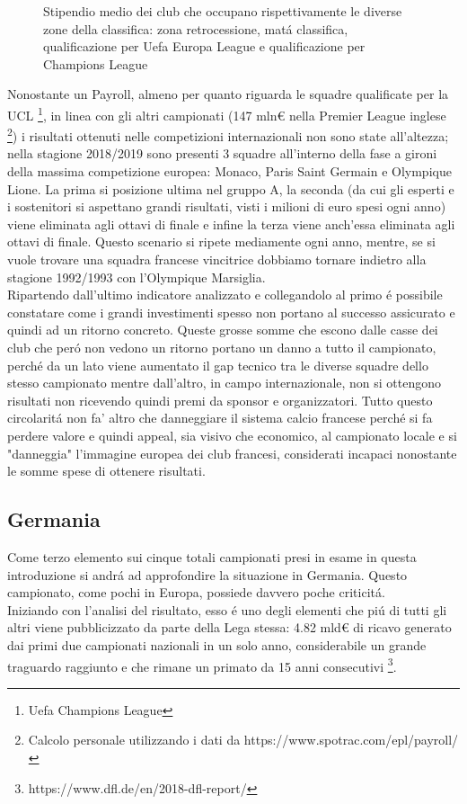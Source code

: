 \documentclass[
    corpo=12pt,
    oneside,
    evenboxes,
    tipotesi=triennale,
    stile=classica,
    oldstyle,
    autoretitolo,
    greek,
]{toptesi}
\begin{document}
\begin{interlinea}{1.5}
\begin{figure}
    \caption{Stipendio medio dei club che occupano rispettivamente le diverse zone della classifica: zona retrocessione, 
    mat\'a classifica, qualificazione per Uefa Europa League e qualificazione per Champions League}
    \label{stipendi_ligue1}
\end{figure}

Nonostante un Payroll, almeno per quanto riguarda le squadre qualificate per la UCL \footnote{Uefa Champions League}, in linea con gli
altri campionati (147 mln€ nella Premier League inglese \footnote{Calcolo personale utilizzando i dati da https://www.spotrac.com/epl/payroll/})
i risultati ottenuti nelle competizioni internazionali non sono state all'altezza; nella stagione 2018/2019 sono presenti 3 squadre 
all'interno della fase a gironi della massima competizione europea: Monaco, Paris Saint Germain e Olympique Lione. La prima si 
posizione ultima nel gruppo A, la seconda (da cui gli esperti e i sostenitori si aspettano grandi risultati, visti i milioni di euro 
spesi ogni anno) viene eliminata agli ottavi di finale e infine la terza viene anch'essa eliminata agli ottavi di finale. Questo scenario
si ripete mediamente ogni anno, mentre, se si vuole trovare una squadra francese vincitrice dobbiamo tornare indietro alla stagione 1992/1993
con l'Olympique Marsiglia.\\
Ripartendo dall'ultimo indicatore analizzato e collegandolo al primo \'e possibile constatare come i grandi investimenti spesso non portano 
al successo assicurato e quindi ad un ritorno concreto. Queste grosse somme che escono dalle casse dei club che per\'o
non vedono un ritorno portano un danno a tutto il campionato, perch\'e da un lato viene aumentato il gap tecnico tra le diverse squadre dello
stesso campionato mentre dall'altro, in campo internazionale, non si ottengono risultati non ricevendo quindi premi da sponsor e organizzatori.
Tutto questo circolarit\'a non fa' altro che danneggiare il sistema calcio francese perch\'e si fa perdere valore e quindi appeal, sia 
visivo che economico, al campionato locale e si "danneggia" l'immagine europea dei club francesi, considerati incapaci nonostante le somme spese
di ottenere risultati.

\subsection{Germania}
Come terzo elemento sui cinque totali campionati presi in esame in questa introduzione si andr\'a ad approfondire la situazione
in Germania. Questo campionato, come pochi in Europa, possiede davvero poche criticit\'a.\\
Iniziando con l'analisi del risultato, esso \'e uno degli elementi che pi\'u di tutti gli altri viene pubblicizzato 
da parte della Lega stessa: 4.82 mld€ di ricavo generato dai primi due campionati nazionali in un solo anno,
considerabile un grande traguardo raggiunto e che rimane un primato da 15 anni consecutivi
\footnote{https://www.dfl.de/en/2018-dfl-report/}.


\end{interlinea}
\end{document}
